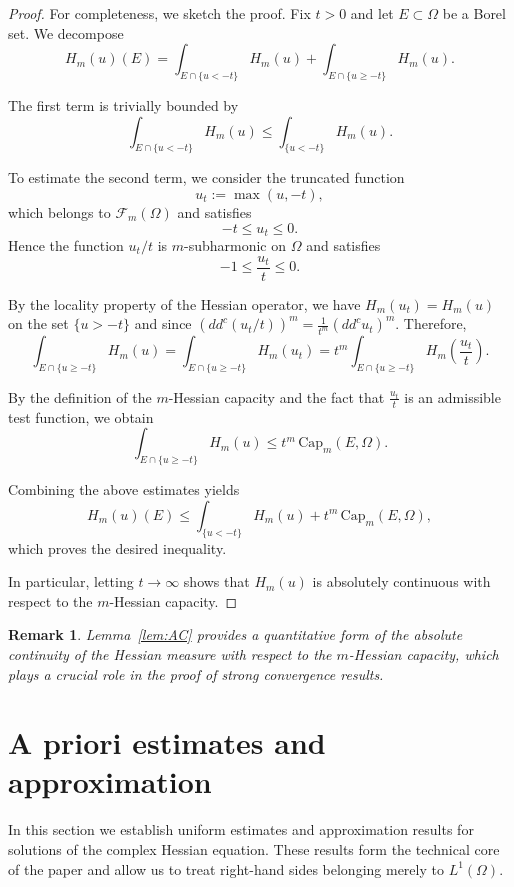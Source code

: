 \documentclass[10pt,a4paper]{amsart}
\newtheorem{remark}[theorem]{Remark}
\newcommand{\ddc}{dd^c}
\begin{document}
	\begin{proof}
For completeness, we sketch the proof.
		Fix $t>0$ and let $E\subset\Omega$ be a Borel set.
		We decompose
		\[
		H_m(u)(E)
		=
		\int_{E\cap\{u<-t\}} H_m(u)
		+
		\int_{E\cap\{u\ge -t\}} H_m(u).
		\]
		
		The first term is trivially bounded by
		\[
		\int_{E\cap\{u<-t\}} H_m(u)
		\le
		\int_{\{u<-t\}} H_m(u).
		\]
		
		To estimate the second term, we consider the truncated function
		\[
		u_t := \max(u,-t),
		\]
		which belongs to $\mathcal F_m(\Omega)$ and satisfies
		\[
		- t \le u_t \le 0.
		\]
		Hence the function $u_t/t$ is $m$-subharmonic on $\Omega$ and satisfies
		\[
		-1 \le \frac{u_t}{t} \le 0.
		\]
		
		By the locality property of the Hessian operator,
		we have $H_m(u_t) = H_m(u)$ on the set $\{u>-t\}$ and since $(\ddc(u_t/t))^m = \frac{1}{t^m}(\ddc u_t)^m$. Therefore,
		\[
		\int_{E\cap\{u\ge -t\}} H_m(u)
		=
		\int_{E\cap\{u\ge -t\}} H_m(u_t)
		=
		t^m \int_{E\cap\{u\ge -t\}} H_m\!\left(\frac{u_t}{t}\right).
		\]
		
		By the definition of the $m$-Hessian capacity and the fact that
		$\frac{u_t}{t}$ is an admissible test function, we obtain
		\[
		\int_{E\cap\{u\ge -t\}} H_m(u)
		\le
		t^m \, \mathrm{Cap}_m(E,\Omega).
		\]
		
		Combining the above estimates yields
		\[
		H_m(u)(E)
		\le
		\int_{\{u<-t\}} H_m(u)
		+
		t^m \, \mathrm{Cap}_m(E,\Omega),
		\]
		which proves the desired inequality.
		
		In particular, letting $t\to\infty$ shows that $H_m(u)$ is absolutely
		continuous with respect to the $m$-Hessian capacity.
	\end{proof}
	\begin{remark}
		Lemma~\ref{lem:AC} provides a quantitative form of the absolute continuity
		of the Hessian measure with respect to the $m$-Hessian capacity,
		which plays a crucial role in the proof of strong convergence results.
	\end{remark}
	
	\section{A priori estimates and approximation}
	
	In this section we establish uniform estimates and approximation results for solutions of the complex Hessian equation.
	These results form the technical core of the paper and allow us to treat right-hand sides belonging merely to $L^1(\Omega)$.
	
\end{document}
